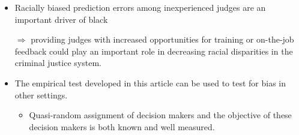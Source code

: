 \documentclass[../root]{subfiles}
\begin{document}
    \begin{itemize}
      \item Racially biased prediction errors among inexperienced judges are an important driver of black

      $\Rightarrow$ providing judges with increased opportunities for training or on-the-job feedback could play an important role in decreasing racial disparities in the criminal justice system.

      \item The empirical test developed in this article can be used to test for bias in other settings.
      \begin{itemize}
        \item Quasi-random assignment of decision makers and the objective of these decision makers is both known and well measured.
      \end{itemize}
    \end{itemize}


    \biblio
\end{document}
